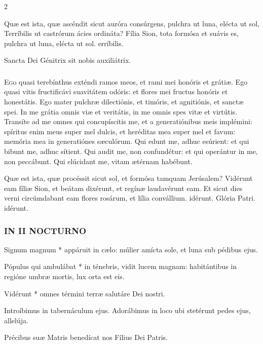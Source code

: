 \documentclass[9pt,twoside]{extarticle}
\begin{document}
\begin{multicols}{2}
\begin{tightlist}{}
\item {} Quæ est ista, quæ ascéndit sicut auróra consúrgens, pulchra ut luna, elécta ut sol, \textred{*} Terríbilis ut castrórum ácies ordináta? 
 Fília Sion, tota formósa et suávis es, pulchra ut luna, elécta ut sol. erríbilis.
\item {\small {} Sancta Dei Génitrix sit nobis auxiliátrix.}
\end{tightlist}

\subsubsection*{\center {}}
\lettrine{E}go quasi terebínthus exténdi ramos meos, et rami mei honóris et grátiæ.
Ego quasi vitis fructificávi suavitátem odóris: et flores mei fructus honóris et honestátis.
Ego mater pulchræ dilectiónis, et timóris, et agnitiónis, et sanctæ spei.
In me grátia omnis viæ et veritátis, in me omnis spes vitæ et virtútis.
Transíte ad me omnes qui concupíscitis me, et a generatiónibus meis implémini:
spíritus enim meus super mel dulcis, et heréditas mea super mel et favum:
memória mea in generatiónes sæculórum.
Qui edunt me, adhuc esúrient: et qui bibunt me, adhuc sítient.
Qui audit me, non confundétur: et qui operántur in me, non peccábunt.
Qui elúcidant me, vitam ætérnam habébunt.

\begin{tightlist}{}
\item {} Quæ est ista, quæ procéssit sicut sol, et formósa tamquam Jerúsalem? \textred{*} Vidérunt eam fíliæ Sion, et beátam dixérunt, et regínæ laudavérunt eam.  Et sicut dies verni circúmdabant eam flores rosárum, et lília convállium. idérunt. Glória Patri. idérunt.
\end{tightlist}

\subsubsection*{\center \textsc{IN II NOCTURNO}}
\begin{tightlist}{}
\item {} Signum magnum * appáruit in cælo: múlier amícta sole, et luna sub pédibus ejus.
\item {} Pópulus qui ambulábat * in ténebris, vidit lucem magnam: habitántibus in regióne umbræ mortis, lux orta est eis.
\item {} Vidérunt * omnes términi terræ salutáre Dei nostri.
\item {} Introíbimus in tabernáculum ejus.  Adorábimus in loco ubi stetérunt pedes ejus, allelúja.
\item {\small {} Précibus suæ Matris benedícat nos Fílius Dei Patris.}
\end{tightlist}


\end{multicols}
\end{document}
